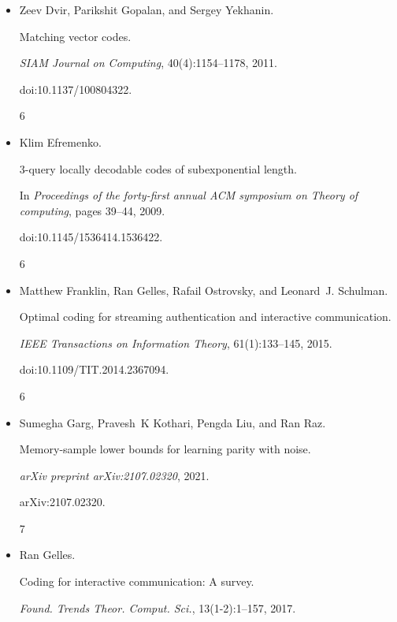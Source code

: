 \begin{itemize}
doi:10.1145/2746539.2746591.


6




\item[] 
[6]

Zeev Dvir, Parikshit Gopalan, and Sergey Yekhanin.


Matching vector codes.


\emph{SIAM Journal on Computing}, 40(4):1154–1178, 2011.


doi:10.1137/100804322.


6




\item[] 
[7]

Klim Efremenko.


3-query locally decodable codes of subexponential length.


In \emph{Proceedings of the forty-first annual ACM symposium on Theory
of computing}, pages 39–44, 2009.


doi:10.1145/1536414.1536422.


6




\item[] 
[8]

Matthew Franklin, Ran Gelles, Rafail Ostrovsky, and Leonard J. Schulman.


Optimal coding for streaming authentication and interactive
communication.


\emph{IEEE Transactions on Information Theory}, 61(1):133–145, 2015.


doi:10.1109/TIT.2014.2367094.


6




\item[] 
[9]

Sumegha Garg, Pravesh K Kothari, Pengda Liu, and Ran Raz.


Memory-sample lower bounds for learning parity with noise.


\emph{arXiv preprint arXiv:2107.02320}, 2021.


arXiv:2107.02320.


7




\item[] 
[10]

Ran Gelles.


Coding for interactive communication: A survey.


\emph{Found. Trends Theor. Comput. Sci.}, 13(1-2):1–157, 2017.



\end{itemize}
